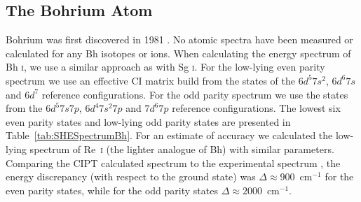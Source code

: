 \documentclass[10pt,a4paper, twoside, openright]{report}
\begin{document}
\subsection{The Bohrium Atom}  \label{sec:Bh}

 Bohrium was first discovered in 1981 \cite{Munzenberg1981}. No atomic spectra have been measured or calculated for any Bh isotopes or ions. When calculating the energy spectrum of Bh \textsc{i}, we use a similar approach as with Sg \textsc{i}.  For the low-lying even parity spectrum we use an effective CI matrix build from the states of the $6d^5 7s^2$, $6d^6 7s$ and $6d^7$ reference configurations. For the odd parity spectrum we use the states from the $6d^5 7s 7p$, $6d^4 7s^2 7p$ and $7d^6 7p$ reference configurations. The lowest six even parity states and low-lying odd parity states are presented in Table~\ref{tab:SHESpectrumBh}. For an estimate of accuracy we calculated the low-lying spectrum of Re~\textsc{i} (the lighter analogue of Bh) with similar parameters. Comparing the CIPT calculated spectrum to the experimental spectrum \cite{NIST_ASD}, the energy discrepancy (with respect to the ground state) was $\Delta \approx 900$~cm$^{-1}$ for the even parity states, while for the odd parity states $\Delta \approx 2000$~cm$^{-1}$.\\
\linebreak
\end{document}

